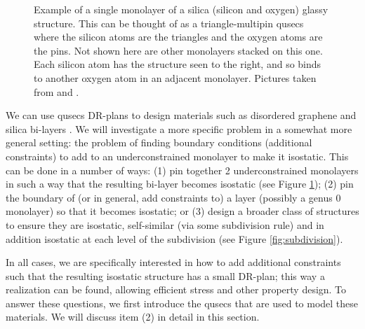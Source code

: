 \begin{figure}
    \caption{Example of a single monolayer of a silica (silicon and oxygen) glassy structure. This can be thought of as a triangle-multipin qusecs where the silicon atoms are the triangles and the oxygen atoms are the pins. Not shown here are other monolayers stacked on this one. Each silicon atom has the structure seen to the right, and so binds to another oxygen atom in an adjacent monolayer. Pictures taken from \cite{silica_figure} and \cite{tetra_silica_figure}.}
    \label{fig:silica_glass}
\end{figure}


We can use qusecs DR-plans to design materials such as disordered graphene and silica bi-layers \cite{silica_bilayers} \cite{sructure_of_2d_glass}. We will investigate a more specific problem in a somewhat more general setting: the problem of finding boundary conditions (additional constraints) to add to an underconstrained monolayer to make it isostatic. This can be done in a number of ways: (1) pin together 2 underconstrained monolayers in such a way that the resulting bi-layer becomes isostatic (see Figure \ref{fig:silica_glass}); (2) pin the boundary of (or in general, add constraints to) a layer (possibly a genus 0 monolayer) so that it becomes isostatic; or (3) design a broader class of structures to ensure they are isostatic, self-similar (via some subdivision rule) and in addition isostatic at each level of the subdivision (see Figure \ref{fig:subdivision}).

In all cases, we are specifically interested in how to add additional constraints such that the resulting isostatic structure has a small DR-plan; this way a realization can be found, allowing efficient stress and other property design. To answer these questions, we first introduce the qusecs that are used to model these materials. We will discuss item (2) in detail in this section.


